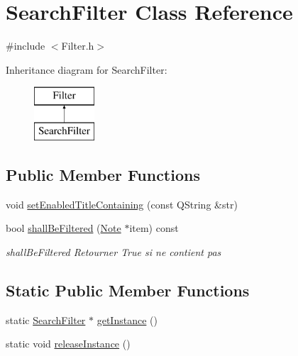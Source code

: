\hypertarget{class_search_filter}{\section{Search\-Filter Class Reference}
\label{class_search_filter}
}


{\ttfamily \#include $<$Filter.\-h$>$}

Inheritance diagram for Search\-Filter\-:\begin{figure}[H]
\begin{center}
\leavevmode
\includegraphics[height=2.000000cm]{class_search_filter}
\end{center}
\end{figure}
\subsection*{Public Member Functions}
\begin{DoxyCompactItemize}
\item 
void \hyperlink{class_search_filter_ac8607cd517d1ae9ade128095261dffce}{set\-Enabled\-Title\-Containing} (const Q\-String \&str)
\item 
bool \hyperlink{class_search_filter_a7b3443afaa52644460273e2facd04005}{shall\-Be\-Filtered} (\hyperlink{class_note}{Note} $\ast$item) const 
\begin{DoxyCompactList}\small\item\em shall\-Be\-Filtered Retourner True si  ne contient pas  \end{DoxyCompactList}\end{DoxyCompactItemize}
\subsection*{Static Public Member Functions}
\begin{DoxyCompactItemize}
\item 
static \hyperlink{class_search_filter}{Search\-Filter} $\ast$ \hyperlink{class_search_filter_af7f1b9a6c5a23ca75d856548c617f1e1}{get\-Instance} ()
\item 
static void \hyperlink{class_search_filter_a55c5909b27ad13db9f23de47e825484d}{release\-Instance} ()
\end{DoxyCompactItemize}


